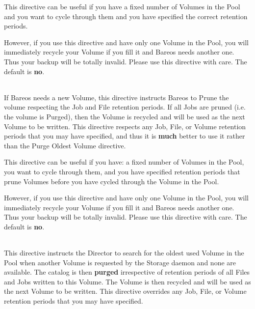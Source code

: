 \begin{description}
This directive can be useful if you have a fixed number of Volumes in the
Pool and you want to cycle through them and you have specified the correct
retention periods.

However, if you use this directive and have only one
Volume in the Pool, you will immediately recycle your Volume if you fill
it and Bareos needs another one. Thus your backup will be totally invalid.
Please use this directive with care. The default is {\bf no}.

\label{RecycleCurrent}
\item [Recycle Current Volume = {\textless}yes{\textbar}no{\textgreater}] \hfill \\
If Bareos needs a new Volume, this directive instructs Bareos to Prune
the volume respecting the Job and File retention periods.  If all Jobs
are pruned (i.e.  the volume is Purged), then the Volume is recycled and
will be used as the next Volume to be written.  This directive respects
any Job, File, or Volume retention periods that you may have specified,
and thus it is {\bf much} better to use it rather than the Purge Oldest
Volume directive.

This directive can be useful if you have: a fixed number of Volumes in
the Pool, you want to cycle through them, and you have specified
retention periods that prune Volumes before you have cycled through the
Volume in the Pool.

However, if you use this directive and have only one Volume in the Pool,
you will immediately recycle your Volume if you fill it and Bareos needs
another one.  Thus your backup will be totally invalid.  Please use this
directive with care.  The default is {\bf no}.

\label{PurgeOldest}
\item [Purge Oldest Volume = {\textless}yes{\textbar}no{\textgreater}] \hfill \\
This directive instructs the Director to search for the oldest used
Volume in the Pool when another Volume is requested by the Storage
daemon and none are available.  The catalog is then {\bf purged}
irrespective of retention periods of all Files and Jobs written to this
Volume.  The Volume is then recycled and will be used as the next Volume
to be written.  This directive overrides any Job, File, or Volume
retention periods that you may have specified.


\end{description}

